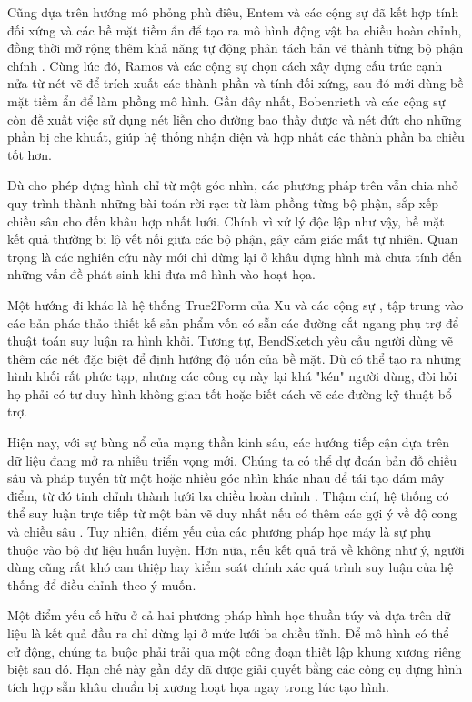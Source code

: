 \documentclass{report}
\begin{document}
Cũng dựa trên hướng mô phỏng phù điêu, Entem và các cộng sự \citep{Entem2015} đã kết hợp tính đối xứng và các bề mặt tiềm ẩn để tạo ra mô hình động vật ba chiều hoàn chỉnh, đồng thời mở rộng thêm khả năng tự động phân tách bản vẽ thành từng bộ phận chính \citep{Entem2019}. Cùng lúc đó, Ramos và các cộng sự \citep{Ramos2018} chọn cách xây dựng cấu trúc cạnh nửa từ nét vẽ để trích xuất các thành phần và tính đối xứng, sau đó mới dùng bề mặt tiềm ẩn để làm phồng mô hình. Gần đây nhất, Bobenrieth và các cộng sự \citep{Bobenrieth2020} còn đề xuất việc sử dụng nét liền cho đường bao thấy được và nét đứt cho những phần bị che khuất, giúp hệ thống nhận diện và hợp nhất các thành phần ba chiều tốt hơn.

Dù cho phép dựng hình chỉ từ một góc nhìn, các phương pháp trên vẫn chia nhỏ quy trình thành những bài toán rời rạc: từ làm phồng từng bộ phận, sắp xếp chiều sâu cho đến khâu hợp nhất lưới. Chính vì xử lý độc lập như vậy, bề mặt kết quả thường bị lộ vết nối giữa các bộ phận, gây cảm giác mất tự nhiên. Quan trọng là các nghiên cứu này mới chỉ dừng lại ở khâu dựng hình mà chưa tính đến những vấn đề phát sinh khi đưa mô hình vào hoạt họa.

Một hướng đi khác là hệ thống True2Form của Xu và các cộng sự \citep{Xu2014}, tập trung vào các bản phác thảo thiết kế sản phẩm vốn có sẵn các đường cắt ngang phụ trợ để thuật toán suy luận ra hình khối. Tương tự, BendSketch \citep{Li2017} yêu cầu người dùng vẽ thêm các nét đặc biệt để định hướng độ uốn của bề mặt. Dù có thể tạo ra những hình khối rất phức tạp, nhưng các công cụ này lại khá "kén" người dùng, đòi hỏi họ phải có tư duy hình không gian tốt hoặc biết cách vẽ các đường kỹ thuật bổ trợ.

Hiện nay, với sự bùng nổ của mạng thần kinh sâu, các hướng tiếp cận dựa trên dữ liệu đang mở ra nhiều triển vọng mới. Chúng ta có thể dự đoán bản đồ chiều sâu và pháp tuyến từ một hoặc nhiều góc nhìn khác nhau để tái tạo đám mây điểm, từ đó tinh chỉnh thành lưới ba chiều hoàn chỉnh \citep{Lun2017, Delanoy2018}. Thậm chí, hệ thống có thể suy luận trực tiếp từ một bản vẽ duy nhất nếu có thêm các gợi ý về độ cong và chiều sâu \citep{Li2018}. Tuy nhiên, điểm yếu của các phương pháp học máy là sự phụ thuộc vào bộ dữ liệu huấn luyện. Hơn nữa, nếu kết quả trả về không như ý, người dùng cũng rất khó can thiệp hay kiểm soát chính xác quá trình suy luận của hệ thống để điều chỉnh theo ý muốn.

Một điểm yếu cố hữu ở cả hai phương pháp hình học thuần túy và dựa trên dữ liệu là kết quả đầu ra chỉ dừng lại ở mức lưới ba chiều tĩnh. Để mô hình có thể cử động, chúng ta buộc phải trải qua một công đoạn thiết lập khung xương riêng biệt sau đó. Hạn chế này gần đây đã được giải quyết bằng các công cụ dựng hình tích hợp sẵn khâu chuẩn bị xương hoạt họa ngay trong lúc tạo hình.
\end{document}
